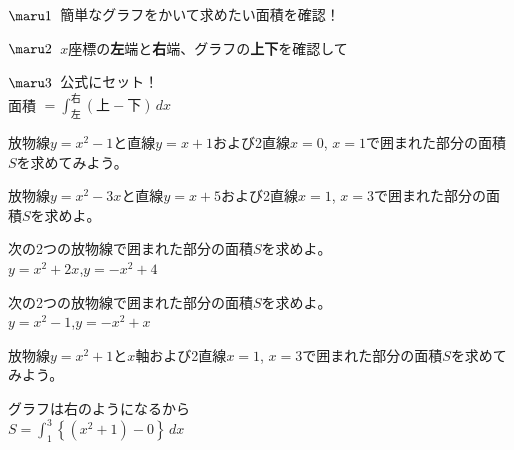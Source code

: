 \begin{multicols*}{4}
 \columnbreak{}
 
 
 \columnbreak{}
 
 
 \columnbreak{}
 
 \begin{tcolorbox}[title=The 面積の公式！,colback=orange!5,colframe=orange,colbacktitle=orange!10,coltitle=orange]
  $\maru1$\ 簡単なグラフをかいて求めたい面積を確認！
  
  $\maru2$\ $x$座標の\textbf{左}端と\textbf{右}端、グラフの\textbf{上下}を確認して
  
  $\maru3$\ 公式にセット！\\
  \LARGE
  面積 $= \displaystyle\int_{左}^{右} \left( 上 - 下 \right)\,dx$
 \end{tcolorbox}
 \vspace{1\zw}
 
 \vspace{1\zw}
 
 放物線$y=x^2-1$と直線$y=x+1$および2直線$x=0$, $x=1$で囲まれた部分の面積$S$を求めてみよう。
 \vfill
 
 放物線$y=x^2-3x$と直線$y=x+5$および2直線$x=1$, $x=3$で囲まれた部分の面積$S$を求めよ。
 \begin{ansBlockSize}{40}
 \end{ansBlockSize}
 
 \columnbreak{}
 次の2つの放物線で囲まれた部分の面積$S$を求めよ。\\
 \hspace{3\zw}$y=x^2+2x$,\quad{}$y=-x^2+4$
 \vfill
 
 次の2つの放物線で囲まれた部分の面積$S$を求めよ。\\
 \hspace{3\zw}$y=x^2-1$,\quad{}$y=-x^2+x$
 \begin{ansBlockSize}{45}
 \end{ansBlockSize}
 
 \columnbreak{}
 
 放物線$y=x^2+1$と$x$軸および2直線$x=1$, $x=3$で囲まれた部分の面積$S$を求めてみよう。
 \begin{ansBlockSize}{40}
  グラフは右のようになるから\\
  $S = \displaystyle\int_{1}^{3}\left\{(x^2+1)-0\right\}\,dx$
 \end{ansBlockSize}
 

\end{multicols*}
